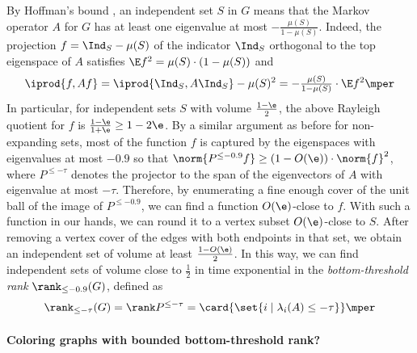 By Hoffman's bound \cite{hoffman}, an independent set \(S\) in \(G\) means that the Markov operator \(A\) for \(G\) has at least one eigenvalue at most \(-\tfrac{\mu(S)}{1-\mu(S)}\).
Indeed, the projection \(f=\Ind_{S}-\mu(S)\) of the indicator \(\Ind_{S}\) orthogonal to the top eigenspace of \(A\) satisfies \(\E f^{2}=\mu(S)\cdot (1-\mu(S))\) and
\begin{equation}
  \iprod{f,Af}
  = \iprod{\Ind_{S},A \Ind_{S}}-\mu(S)^{2}
  = -\tfrac{\mu(S)}{1-\mu(S)} \cdot \E f^{2}
  \mper
\end{equation}
In particular, for independent sets \(S\) with volume \(\tfrac {1-\e}2\), the above Rayleigh quotient for \(f\) is \(\tfrac{1-\e}{1+\e}\ge 1-2\e\).
By a similar argument as before for non-expanding sets, most of the function \(f\) is captured by the eigenspaces with eigenvalues at most \(-0.9\) so that \(\norm{P^{\le -0.9}f}\ge (1-O(\e))\cdot \norm{f}^{2}\),
where \(P^{\le -\tau}\) denotes the projector to the span of the eigenvectors of \(A\) with eigenvalue at most \(-\tau\).
Therefore, by enumerating a fine enough cover of the unit ball of the image of \(P^{\le -0.9}\), we can find a function \(O(\e)\)-close to \(f\).
With such a function in our hands, we can round it to a vertex subset \(O(\e)\)-close to \(S\).
After removing a vertex cover of the edges with both endpoints in that set, we obtain an independent set of volume at least \(\tfrac{1-O(\e)}{2}\).
In this way, we can find independent sets of volume close to \(\tfrac 12\) in time exponential in the \emph{bottom-threshold rank} \(\rank_{\le -0.9}(G)\), defined as
\begin{equation}
  \rank_{\le -\tau} (G)
  = \rank P^{\le -\tau}
  = \card{\set{i \mid \lambda_{i}(A)\le -\tau}}
  \mper
\end{equation}

\paragraph{Coloring graphs with bounded bottom-threshold rank?}

